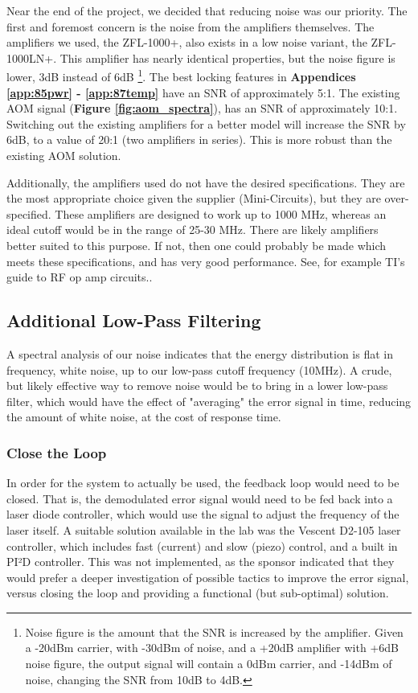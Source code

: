 Near the end of the project, we decided that reducing noise was our priority.  The first and foremost concern is the noise from the amplifiers themselves.  The amplifiers we used, the ZFL-1000+, also exists in a low noise variant, the ZFL-1000LN+.  This amplifier has nearly identical properties, but the noise figure is lower, 3dB instead of 6dB \footnote{Noise figure is the amount that the SNR is increased by the amplifier.  Given a -20dBm carrier, with -30dBm of noise, and a +20dB amplifier with +6dB noise figure, the output signal will contain a 0dBm carrier, and -14dBm of noise, changing the SNR from 10dB to 4dB.}. The best locking features in \textbf{Appendices \ref{app:85pwr} - \ref{app:87temp}} have an SNR of approximately 5:1. The existing AOM signal (\textbf{Figure \ref{fig:aom_spectra}}), has an SNR of approximately 10:1. Switching out the existing amplifiers for a better model will increase the SNR by 6dB, to a value of 20:1 (two amplifiers in series). This is more robust than the existing AOM solution.

Additionally, the amplifiers used do not have the desired specifications.  They are the most appropriate choice given the supplier (Mini-Circuits), but they are over-specified.  These amplifiers are designed to work up to 1000 MHz, whereas an ideal cutoff would be in the range of 25-30 MHz.  There are likely amplifiers better suited to this purpose.  If not, then one could probably be made which meets these specifications, and has very good performance.  See, for example TI's guide to RF op amp circuits.\cite{ti_amps}.

\subsection{Additional Low-Pass Filtering}

A spectral analysis of our noise indicates that the energy distribution is flat in frequency, white noise, up to our low-pass cutoff frequency (10MHz).  A crude, but likely effective way to remove noise would be to bring in a lower low-pass filter, which would have the effect of "averaging" the error signal in time, reducing the amount of white noise, at the cost of response time.


\subsubsection{Close the Loop}

In order for the system to actually be used, the feedback loop would need to be closed.  That is, the demodulated error signal would need to be fed back into a laser diode controller, which would use the signal to adjust the frequency of the laser itself.  A suitable solution available in the lab was the Vescent D2-105 laser controller, which includes fast (current) and slow (piezo) control, and a built in PI²D controller.  This was not implemented, as the sponsor indicated that they would prefer a deeper investigation of possible tactics to improve the error signal, versus closing the loop and providing a functional (but sub-optimal) solution.

